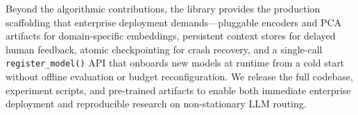 Beyond the algorithmic contributions, the library provides the production scaffolding that enterprise deployment demands---pluggable encoders and PCA artifacts for domain-specific embeddings, persistent context stores for delayed human feedback, atomic checkpointing for crash recovery, and a single-call \texttt{register\_model()} API that onboards new models at runtime from a cold start without offline evaluation or budget reconfiguration.  We release the full codebase, experiment scripts, and pre-trained artifacts to enable both immediate enterprise deployment and reproducible research on non-stationary LLM routing.